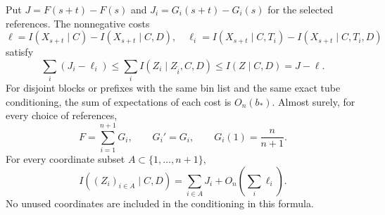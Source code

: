 \begin{lemma}
\label{t:additivity}
Put $J=F(s+t)-F(s)$ and $J_i=G_i(s+t)-G_i(s)$ for the selected references.
The nonnegative costs
\[
 \ell=I(X_{s+t}\mid C)-I(X_{s+t}\mid C,D),\quad
 \ell_i=I(X_{s+t}\mid C,T_i)-I(X_{s+t}\mid C,T_i,D)
\]
satisfy
\begin{equation}\label{t:block-comparison}
 \sum_i(J_i-\ell_i)
 \le\sum_i I(Z_i\mid Z_{\widehat i},C,D)
 \le I(Z\mid C,D)=J-\ell.
\end{equation}
For disjoint blocks or prefixes with the same bin list and the same
exact tube conditioning, the sum of expectations of each cost is
$O_n(b_*)$.  Almost surely, for every choice of references,
\begin{equation}\label{t:replacement}
 F=\sum_{i=1}^{n+1}G_i,\qquad G_i'=G_i,\qquad
 G_i(1)=\frac n{n+1}.
\end{equation}
For every coordinate subset $A\subset\{1,\ldots,n+1\}$,
\begin{equation}\label{t:subset-information}
 I((Z_i)_{i\in A}\mid C,D)
       =\sum_{i\in A}J_i+O_n\left(\sum_i\ell_i\right).
\end{equation}
No unused coordinates are included in the conditioning in this formula.
\end{lemma}


